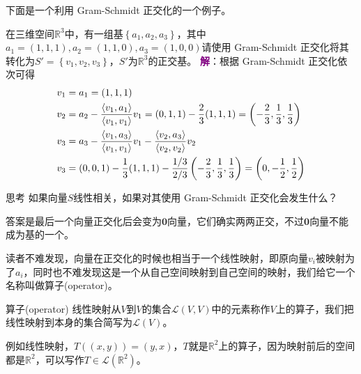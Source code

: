 下面是一个利用 Gram-Schmidt 正交化的一个例子。

\begin{example}
	在三维空间$\mathbb{R}^3$中，有一组基$\left\{ a_1,a_2,a_3 \right\}$，其中$a_1=(1,1,1),a_2=(1,1,0),a_3=(1,0,0)$请使用 Gram-Schmidt 正交化将其转化为$S'=\left\{ v_1,v_2,v_3 \right\}$，$S'$为$\mathbb{R}^3$的正交基。
	\tcblower
	\textcolor{purple}{\textbf{解}}：根据 Gram-Schmidt 正交化依次可得\begin{align}
		&v_1=a_1=(1,1,1)\\&v_2=a_2-\frac{\left \langle v_1,a_1 \right \rangle }{\left \langle v_1,v_1 \right \rangle }v_1=(0,1,1)-\frac{2}{3}(1,1,1)=\left( -\frac{2}{3},\frac{1}{3},\frac{1}{3} \right)\\&v_3=a_3-\frac{\left \langle v_1,a_3 \right \rangle }{\left \langle v_1,v_1 \right \rangle }v_1-\frac{\left \langle v_2,a_3 \right \rangle }{\left \langle v_2,v_2 \right \rangle }v_2\notag\\&v_3=(0,0,1)-\frac{1}{3}(1,1,1)-\frac{1/3}{2/3}\left( -\frac{2}{3},\frac{1}{3},\frac{1}{3}  \right)=\left( 0,-\frac{1}{2},\frac{1}{2} \right)
	\end{align}
\end{example}

\begin{ascolorbox1}{思考}
	如果向量$S$线性相关，如果对其使用 Gram-Schmidt 正交化会发生什么？
\end{ascolorbox1}

答案是最后一个向量正交化后会变为$\boldsymbol{0}$向量，它们确实两两正交，不过$\boldsymbol{0}$向量不能成为基的一个。

读者不难发现，向量在正交化的时候也相当于一个线性映射，即原向量$v_i$被映射为了$a_i$，同时也不难发现这是一个从自己空间映射到自己空间的映射，我们给它一个名称叫做算子(operator)。

\begin{definition}{算子(operator)}
	线性映射从$V$到$V$的集合$\mathcal{L}(V,V)$中的元素称作$V$上的算子，我们把线性映射到本身的集合简写为$\mathcal{L}(V)$。
\end{definition}

例如线性映射，$T((x,y))=(y,x)$，$T$就是$\mathbb{R}^2$上的算子，因为映射前后的空间都是$\mathbb{R}^2$，可以写作$T\in \mathcal{L}(\mathbb{R}^2)$。

